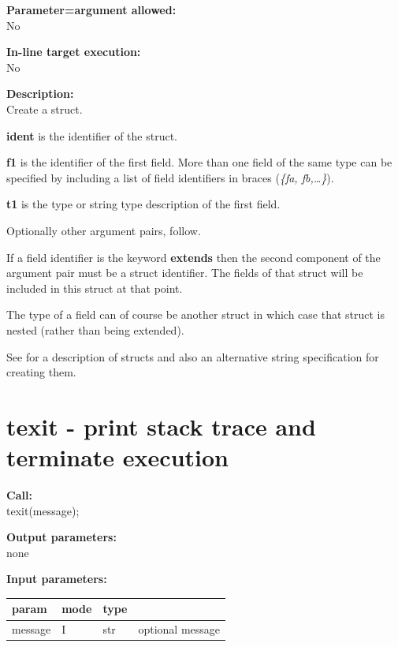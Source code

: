         {\bf Parameter=argument allowed:} \\
        No
        
        {\bf In-line target execution:} \\
        No
        
        {\bf Description:} \\
        Create a struct.
        
        {\bf ident} is the identifier of the struct.
        
        {\bf f1} is the identifier of the first field. More than one
        field of the same type can be specified by including a list
        of field identifiers in braces ({\em \{fa, fb,\dots\}}).

        {\bf t1} is the type or string type description of the first field.
        
        Optionally other argument pairs, follow.

        If a field identifier is the keyword {\bf extends} then the second
        component of the argument pair must be a struct identifier. The
        fields of that struct will be included in this struct at that point.

        The type of a field can of course be another struct in which case
        that struct is nested (rather than being extended).
        
        See  for a description of structs and also
        an alternative string specification for creating them.



    \section{texit - print stack trace and terminate execution}\label{sec:iptexit}
        
        {\bf Call:} \\
        texit(message);
        
        {\bf Output parameters:} \\
        none
        
        {\bf Input parameters:} \\
        \begin{tabular}{| l | l | l | l |}
        \hline
        param  & mode     & type  & \\
        \hline \hline
        message & I & str & optional message   \\ \hline
        \end{tabular}
        
